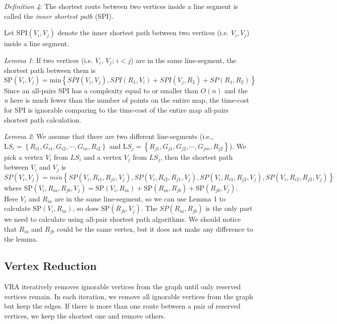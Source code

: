 \noindent \textit{Definition} \textit{4}: The shortest route between two vertices inside a line segment is called the \textit{inner shortest path} (SPI). 

\noindent Let $\mathrm{SPI}\left(V_i,V_j\right)$ denote the inner shortest path between two vertices (i.e. $V_i,V_j$) inside a line segment.

\noindent \textit{Lemma} \textit{1}: If two vertices (i.e. $V_i$, $V_j$; $i<j$) are in the same line-segment, the shortest path between them is
\[\mathrm{SP}\left(V_i,V_j\right)=\mathrm{min}\left\{SPI\left(V_i,V_j\right),SPI\left(R_1,V_i\right)+SPI\left(V_j,R_2\right)+SP\left(R_1,R_2\right)\right\}\] 
Since an all-pairs SPI has a complexity equal to or smaller than $O\left(n\right)$ and the \textit{n} here is much fewer than the number of points on the entire map, the time-cost for SPI is ignorable comparing to the time-cost of the entire map all-pairs shortest path calculation.

\noindent \textit{Lemma 2}: We assume that there are two different line-segments (i.e., $\mathrm{L}S_i=\left\{R_{i1},G_{i1},G_{i2},\mathrm{\cdots },G_{in},R_{i2}\right\}$ and $\mathrm{L}S_j=\left\{R_{j1},G_{j1},G_{j2},\mathrm{\cdots },G_{jm},R_{j2}\right\}$). We pick a vertex $V_i$ from $LS_i$ and a vertex $V_j$ from $LS_j$, then the shortest path between $V_i$ and $V_j$ is 
\[SP\left(V_i,V_j\right)=min\left\{SP\left(V_i,R_{i1},R_{j1},V_j\right),SP\left(V_i,R_{i2},R_{j1},V_j\right),SP\left(V_i,R_{i1},R_{j2},V_j\right),SP\left(V_i,R_{i2},R_{j2},V_j\right)\right\}\] 
where $\mathrm{SP}\left(V_i,R_{ia},R_{jb},V_j\right)=\mathrm{SP}\left(V_i,R_{ia}\right)+\mathrm{SP}\left(R_{ia},R_{jb}\right)+\mathrm{SP}\left(R_{jb},V_j\right)$. Here $V_i$ and $R_{ia}$ are in the same line-segment, so we can use Lemma 1 to calculate $\mathrm{SP}\left(V_i,R_{ia}\right)$, so does $\mathrm{SP}\left(R_{jb},V_j\right)$. The $SP\left(R_{ia},R_{jb}\right)$ is the only part we need to calculate using all-pair shortest path algorithms. We should notice that $R_{ia}$ and $R_{jb}$ could be the same vertex, but it does not make any difference to the lemma.


\subsection{ Vertex Reduction}

\noindent VRA iteratively removes ignorable vertices from the graph until only reserved vertices remain. In each iteration, we remove all ignorable vertices from the graph but keep the edges. If there is more than one route between a pair of reserved vertices, we keep the shortest one and remove others. 


